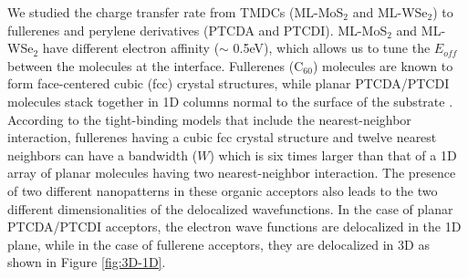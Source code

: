 \documentclass[12pt]{article}
\begin{document}
We studied the charge transfer rate from TMDCs (ML-MoS$_2$ and ML-WSe$_2$) to fullerenes and perylene derivatives (PTCDA and PTCDI). ML-MoS$_2$ and ML-WSe$_2$ have different electron affinity ($\sim$ 0.5eV), which allows us to tune the $E_{off}$ between the molecules at the interface. Fullerenes (C$_{60}$) molecules are known to form face-centered cubic (fcc) crystal structures, while planar PTCDA/PTCDI molecules stack together in 1D columns normal to the surface of the substrate \cite{ching1991first,ludwig1994stm}. According to the tight-binding models that include the nearest-neighbor interaction, fullerenes having a cubic fcc crystal structure and twelve nearest neighbors can have a bandwidth ($W$) which is six times larger than that of a 1D array of planar molecules having two nearest-neighbor interaction. The presence of two different nanopatterns in these organic acceptors also leads to the two different dimensionalities of the delocalized wavefunctions. In the case of planar PTCDA/PTCDI acceptors, the electron wave functions are delocalized in the 1D plane, while in the case of fullerene acceptors, they are delocalized in 3D as shown in Figure \ref{fig:3D-1D}.
\end{document}
